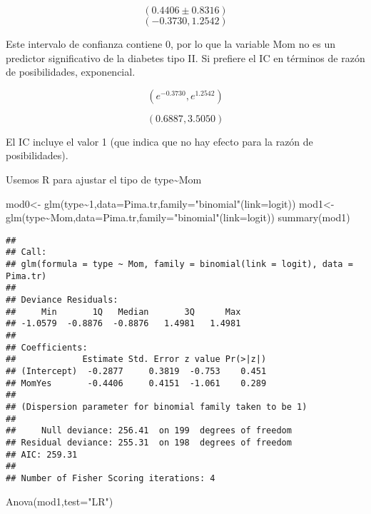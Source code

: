 \documentclass[
]{book}
\newenvironment{Shaded}{\begin{snugshade}}{\end{snugshade}}
\newcommand{\AttributeTok}[1]{\textcolor[rgb]{0.77,0.63,0.00}{#1}}
\newcommand{\DecValTok}[1]{\textcolor[rgb]{0.00,0.00,0.81}{#1}}
\newcommand{\FunctionTok}[1]{\textcolor[rgb]{0.00,0.00,0.00}{#1}}
\newcommand{\NormalTok}[1]{#1}
\newcommand{\OtherTok}[1]{\textcolor[rgb]{0.56,0.35,0.01}{#1}}
\newcommand{\SpecialCharTok}[1]{\textcolor[rgb]{0.00,0.00,0.00}{#1}}
\newcommand{\StringTok}[1]{\textcolor[rgb]{0.31,0.60,0.02}{#1}}
\begin{document}
\[\left( 0.4406 \pm 0.8316\right) \]
\[(-0.3730, 1.2542)\]

Este intervalo de confianza contiene 0, por lo que la variable Mom no es un predictor significativo
de la diabetes tipo II. Si prefiere el IC en términos de razón de posibilidades, exponencial.

\[ \left( e^{-0.3730} , e^{1.2542}\right) \]

\[\left( 0.6887, 3.5050\right) \]

El IC incluye el valor 1 (que indica que no hay efecto para la razón de posibilidades).

Usemos R para ajustar el tipo de type\textasciitilde Mom

\begin{Shaded}
\begin{Highlighting}[]
\NormalTok{mod0}\OtherTok{\textless{}{-}} \FunctionTok{glm}\NormalTok{(type}\SpecialCharTok{\textasciitilde{}}\DecValTok{1}\NormalTok{,}\AttributeTok{data=}\NormalTok{Pima.tr,}\AttributeTok{family=}\StringTok{"binomial"}\NormalTok{(}\AttributeTok{link=}\NormalTok{logit))}
\NormalTok{mod1}\OtherTok{\textless{}{-}} \FunctionTok{glm}\NormalTok{(type}\SpecialCharTok{\textasciitilde{}}\NormalTok{Mom,}\AttributeTok{data=}\NormalTok{Pima.tr,}\AttributeTok{family=}\StringTok{"binomial"}\NormalTok{(}\AttributeTok{link=}\NormalTok{logit))}
\FunctionTok{summary}\NormalTok{(mod1)}
\end{Highlighting}
\end{Shaded}

\begin{verbatim}
## 
## Call:
## glm(formula = type ~ Mom, family = binomial(link = logit), data = Pima.tr)
## 
## Deviance Residuals: 
##     Min       1Q   Median       3Q      Max  
## -1.0579  -0.8876  -0.8876   1.4981   1.4981  
## 
## Coefficients:
##             Estimate Std. Error z value Pr(>|z|)
## (Intercept)  -0.2877     0.3819  -0.753    0.451
## MomYes       -0.4406     0.4151  -1.061    0.289
## 
## (Dispersion parameter for binomial family taken to be 1)
## 
##     Null deviance: 256.41  on 199  degrees of freedom
## Residual deviance: 255.31  on 198  degrees of freedom
## AIC: 259.31
## 
## Number of Fisher Scoring iterations: 4
\end{verbatim}

\begin{Shaded}
\begin{Highlighting}[]
\FunctionTok{Anova}\NormalTok{(mod1,}\AttributeTok{test=}\StringTok{"LR"}\NormalTok{)}
\end{Highlighting}
\end{Shaded}
\end{document}
